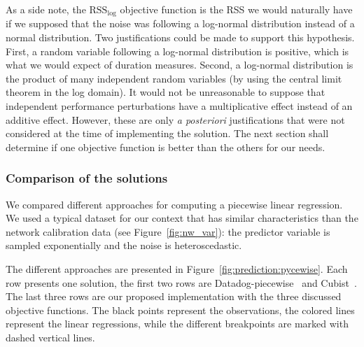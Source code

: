                 As a side note, the \(\text{RSS}_{\log}\) objective function is the RSS we would naturally have if we
                supposed that the noise was following a log-normal distribution instead of a normal distribution. Two
                justifications could be made to support this hypothesis. First, a random variable following a log-normal
                distribution is positive, which is what we would expect of duration measures. Second, a log-normal
                distribution is the product of many independent random variables (by using the central limit theorem in
                the log domain). It would not be unreasonable to suppose that independent performance perturbations have
                a multiplicative effect instead of an additive effect. However, these are only \emph{a posteriori}
                justifications that were not considered at the time of implementing the solution. The next section shall
                determine if one objective function is better than the others for our needs.

            \subsubsection{Comparison of the solutions}%

                We compared different approaches for computing a piecewise linear regression. We used a typical dataset
                for our context that has similar characteristics than the network calibration data (see
                Figure~\ref{fig:nw_var}): the predictor variable is sampled exponentially and the noise is
                heteroscedastic.

                The different approaches are presented in Figure~\ref{fig:prediction:pycewise}. Each row presents one
                solution, the first two rows are Datadog-piecewise~\cite{datadog} and Cubist~\cite{cubist}. The last
                three rows are our proposed implementation with the three discussed objective functions. The black
                points represent the observations, the colored lines represent the linear regressions, while the
                different breakpoints are marked with dashed vertical lines.

